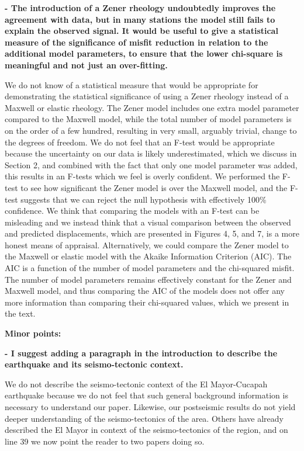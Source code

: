 \documentclass[10pt,a4paper]{letter}
\begin{document}
\begin{letter}{}
\textbf{- The introduction of a Zener rheology undoubtedly improves the agreement with data, but in many stations the model still fails to explain the observed signal. It would be useful to give a statistical measure of the significance of misfit reduction in relation to the additional model parameters, to ensure that the lower chi-square is meaningful and not just an over-fitting.} 

We do not know of a statistical measure that would be appropriate for demonstrating the statistical significance of using a Zener rheology instead of a Maxwell or elastic rheology.  The Zener model includes one extra model parameter compared to the Maxwell model, while  the total number of model parameters is on the order of a few hundred, resulting in very small, arguably trivial, change to the degrees of freedom. We do not feel that an F-test would be appropriate because the uncertainty on our data is likely underestimated, which we discuss in Section 2, and combined with the fact that only one model parameter was added, this results in an F-tests which we feel is overly confident.  We performed the F-test to see how significant the Zener model is over the Maxwell model, and the F-test suggests that we can reject the null hypothesis with effectively 100\% confidence. We think that comparing the models with an F-test can be misleading and we instead think that a visual comparison between the observed and predicted displacements, which are presented in Figures 4, 5, and 7, is a more honest means of appraisal.  Alternatively, we could compare the Zener model to the Maxwell or elastic model with the Akaike Information Criterion (AIC).  The AIC is a function of the number of model parameters and the chi-squared misfit.  The number of model parameters remains effectively constant for the Zener and Maxwell model, and thus comparing the AIC of the models does not offer any more information than comparing their chi-squared values, which we present in the text.

\textbf{Minor points:}

\textbf{- I suggest adding a paragraph in the introduction to describe the earthquake and its seismo-tectonic context.}

We do not describe the seismo-tectonic context of the El Mayor-Cucapah earthquake because we do not feel that such general background information is necessary to understand our paper. Likewise, our postseismic results do not yield deeper understanding of the seismo-tectonics of the area. Others have already described the El Mayor in context of the seismo-tectonics of the region, and on line 39 we now point the reader to two papers doing so.


\end{letter}
\end{document}

